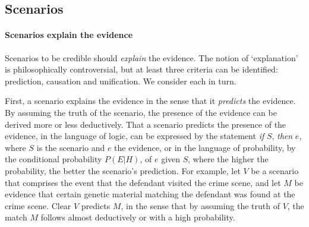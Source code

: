 \documentclass[10pt]{article}
\begin{document}

\subsection{Scenarios}



\paragraph{Scenarios explain the evidence}

Scenarios to be credible should \textit{explain} the evidence. The notion of `explanation' 
is philosophically controversial, but at least three criteria can be identified: prediction, causation 
and unification. We consider each in turn.

First, a scenario explains the evidence in the sense that it \textit{predicts} the evidence. 
By assuming the truth of the scenario, the presence of the evidence 
can be derived more or less deductively. That a scenario predicts the presence 
of the evidence, in the language of logic, can be expressed by the statement \textit{if} $S$, \textit{then} $e$, 
where $S$ is the scenario and $e$ the evidence, or in the language of probability, by the conditional probability $P(E|H)$, of $e$ given $S$, 
where the higher the probability, the better the scenario's prediction. For example, let $V$ be a scenario that comprises 
the event that the defendant visited the crime scene, and let $M$ be evidence that certain genetic material matching the defendant 
was found at the crime scene. Clear $V$ predicts $M$, in the sense that by assuming the truth of $V$, the match $M$ 
follows almost deductively or with a high probability.  
\end{document}
